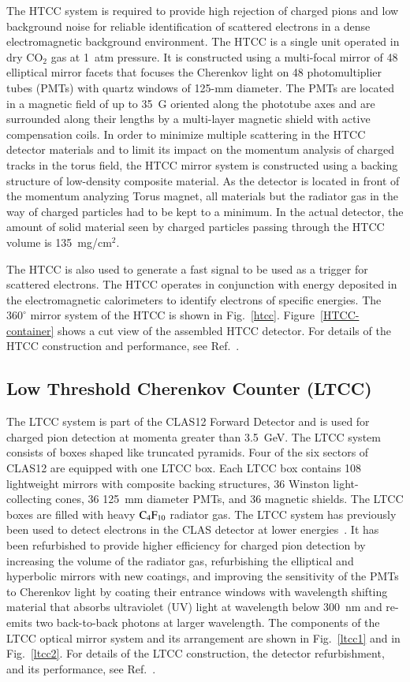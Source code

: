 \documentclass[final,3p,twocolumn]{elsarticle}
\begin{document}
The HTCC system is required to provide high rejection of charged pions and low background noise for reliable 
identification of scattered electrons in a dense electromagnetic background environment. The HTCC is a single unit
operated in dry CO$_2$ gas at 1~atm pressure. It is constructed using a multi-focal mirror of 48 elliptical mirror
facets that focuses the Cherenkov light on 48 photomultiplier tubes (PMTs) with quartz windows of 125-mm diameter.
 The PMTs are located in a magnetic field of up to 35~G oriented along the phototube axes and are surrounded along
their lengths by a multi-layer magnetic shield with active compensation coils. In order to minimize multiple scattering
in the HTCC detector materials and to limit its impact on the momentum analysis of charged tracks in the torus field,
the HTCC mirror system is constructed using a backing structure of low-density composite material. As the detector 
is located in front of the momentum analyzing Torus magnet, all materials but the radiator gas in the 
way of charged particles had to be kept to a minimum. In the actual detector, the amount of
solid material seen by charged particles passing through the HTCC volume is 135~mg/cm$^2$. 

The HTCC is also used to generate a fast signal to be used as a trigger for scattered electrons. The HTCC operates
in conjunction with energy deposited in the electromagnetic calorimeters to identify electrons of specific energies.
The $360^\circ$ mirror system of the HTCC is shown in Fig.~\ref{htcc}. Figure~\ref{HTCC-container} shows a cut
view of the assembled HTCC detector. For details of the HTCC construction and performance, see Ref.~\cite{HTCC}.   

\subsection{Low Threshold Cherenkov Counter (LTCC)}

The LTCC system is part of the CLAS12  Forward Detector and is used for charged pion detection at momenta
greater than 3.5~GeV. The LTCC system consists of boxes shaped like truncated pyramids. Four of the six sectors
of CLAS12 are equipped with one LTCC box. Each LTCC box contains 108 lightweight mirrors with composite
backing structures, 36 Winston light-collecting cones, 36 125~mm diameter PMTs, and 36 magnetic shields. The
LTCC boxes are filled with heavy $\rm C_4F_{10}$ radiator gas. The LTCC system has previously been used to
detect electrons in the CLAS detector at lower energies~\cite{Adams:2001kk}. It has been refurbished to provide
higher efficiency for charged pion detection by increasing the volume of the radiator gas, refurbishing the elliptical
and hyperbolic mirrors with new coatings, and improving the sensitivity of the PMTs to Cherenkov light by coating
their entrance windows with wavelength shifting material that absorbs ultraviolet (UV) light at wavelength below
300~nm and re-emits two back-to-back photons at larger wavelength. The components of the LTCC optical mirror
system and its arrangement are shown in Fig.~\ref{ltcc1} and in Fig.~\ref{ltcc2}. For details of the LTCC construction,
the detector refurbishment, and its performance, see Ref.~\cite{LTCC}.   
\end{document}
